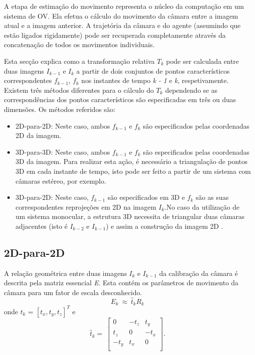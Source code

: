 A etapa de estimação do movimento representa o núcleo da computação em um sistema de OV. Ela efetua o cálculo do movimento da câmara entre a imagem atual e a imagem anterior. A trajetória da câmara e do agente (assumindo que estão ligados rigidamente) pode ser recuperada completamente através da concatenação de todos os movimentos individuais.

Esta secção explica como a transformação relativa \textit{$T_k$} pode ser calculada entre duas imagens \textit{$I_{k-1}$} e \textit{$I_k$} a partir de dois conjuntos de pontos característicos correspondentes \textit{$f_{k-1}$}, \textit{$f_k$} nos instantes de tempo \textit{k - 1} e \textit{k}, respetivamente. Existem três métodos diferentes para o cálculo do \textit{$T_k$} dependendo se as correspondências dos pontos característicos são especificadas em três ou duas dimensões. Os métodos referidos são:


\begin{itemize}
	\item 2D-para-2D: Neste caso, ambos \textit{$f_{k-1}$} e \textit{$f_k$} são especificados pelas coordenadas 2D da imagem.
	\item 3D-para-3D: Neste caso, ambos \textit{$f_{k-1}$} e \textit{$f_k$} são especificados pelas coordenadas 3D da imagem. Para realizar esta ação, é necessário a triangulação de pontos 3D em cada instante de tempo, isto pode ser feito a partir de um sistema com câmaras estéreo, por exemplo.
	\item 3D-para-2D: Neste caso, \textit{$f_{k-1}$} são especificados em 3D e \textit{$f_k$} são as suas correspondentes reprojeções em 2D na imagem \textit{$I_k$}.No caso da utilização de um sistema monocular, a estrutura 3D necessita de triangular duas câmaras adjacentes (isto é \textit{$I_{k-2}$} e \textit{$I_{k-1}$}) e assim a construção da imagem 2D . 
\end{itemize}



\subsection{2D-para-2D}

A relação geométrica entre duas imagens \textit{$I_k$} e \textit{$I_{k-1}$} da calibração da câmara é descrita pela matriz essencial \textit{E}. Esta contém os parâmetros de movimento da câmara para um fator de escala desconhecido. \[ E_k\ \approx\ {\hat{t}}_kR_k \] onde \textit{$t_k$} = $[ \textit{$t_x$}, \textit{$t_y$}, \textit{$t_z$} ]^T$ e \[ \hat{t}_k =\ \left[\begin{array}{ccc}0&-t_z&t_y\\t_z&0&-t_x\\-t_y&t_x&0\\\end{array}\right] . \]

